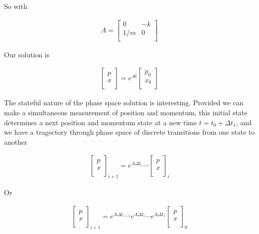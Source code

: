 So with 

\begin{align}\label{eqn:hamiltonian:woo5}
A = 
\begin{bmatrix}
0 & - k \\
1/m & 0 \\
\end{bmatrix}
\end{align}

Our solution is 

\begin{align}\label{eqn:hamiltonian:woo6}
\begin{bmatrix}
p \\
x \\
\end{bmatrix}
=
e^{At}
\begin{bmatrix}
p_0 \\
x_0 \\
\end{bmatrix}
\end{align}

The stateful nature of the phase space solution is interesting.  Provided we can make a simultaneous measurement of position and momentum, this initial state determines a next position and momentum state at a new time $t = t_0 + \Delta t_1$, and we have a tragectory through phase space of discrete transitions from one state to another

\begin{align}\label{eqn:hamiltonian:woo6a}
{\begin{bmatrix}
p \\
x \\
\end{bmatrix}}_{i+1}
=
e^{A \Delta t_{i+1}}
{\begin{bmatrix}
p \\
x \\
\end{bmatrix}}_i
\end{align}

Or 

\begin{align}\label{eqn:hamiltonian:woo6b}
{\begin{bmatrix}
p \\
x \\
\end{bmatrix}}_{i+1}
=
e^{A \Delta t_{i+1}} e^{A \Delta t_{i}} \cdots e^{A \Delta t_1}
{\begin{bmatrix}
p \\
x \\
\end{bmatrix}}_0
\end{align}

